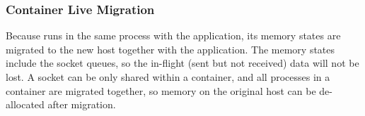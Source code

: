 



\subsubsection{Container Live Migration}
\label{subsubsec:container_live_migration}
\quad

Because \libipc{} runs in the same process with the application, its memory states are migrated to the new host together with the application.
The memory states include the socket queues, so the in-flight (sent but not received) data will not be lost.
A socket can be only shared within a container, and all processes in a container are migrated together, so memory on the original host can be de-allocated after migration.

